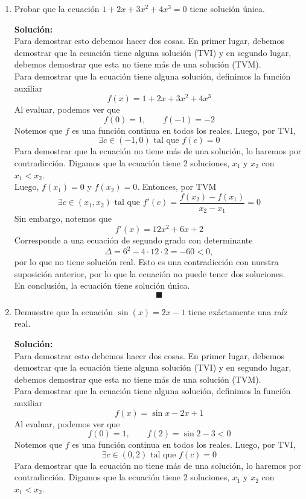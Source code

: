 \documentclass[12pt]{article}
\newenvironment{solucion}
{\begin{mdframed}[backgroundcolor=black!10]
		{\bf Solución:}\\
	}
	{
	\end{mdframed}
}
\newenvironment{preguntas}
{\begin{enumerate}\itemsep12pt
	}
	{
	\end{enumerate}
}
\newcommand{\ra}{\rightarrow}
\begin{document}
\begin{preguntas}
\begin{solucion}
Para $k\in (-\infty, -2) \cup (2, \infty)$, habrán dos puntos críticos en 
$$x = k + \sqrt[]{k^2-4} \qquad y \qquad x = k - \sqrt[]{k^2-4}$$
Notemos además que para $x < k \ra f''(x) < 0$ y para $x > k \ra f''(x) > 0$, por lo que el punto crítico $x = k + \sqrt[]{k^2-4} > k$ corresponderá a un mínimo y $x = k - \sqrt[]{k^2-4} < k$ corresponderá a un máximo.
\end{solucion}
\item Probar que la ecuación $1+2x+3x^2+4x^3=0$ tiene solución única.
\begin{solucion}
Para demostrar esto debemos hacer dos cosas. En primer lugar, debemos demostrar que la ecuación tiene alguna solución (TVI) y en segundo lugar, debemos demostrar que esta no tiene más de una solución (TVM).\\

Para demostrar que la ecuación tiene alguna solución, definimos la función auxiliar
$$f(x) = 1+2x+3x^2+4x^3$$
Al evaluar, podemos ver que
$$f(0) = 1, \qquad f(-1) = -2$$
Notemos que $f$ es una función continua en todos los reales. Luego, por TVI, 
$$\exists c \in (-1,0) \text{ tal que } f(c) = 0$$
Para demostrar que la ecuación no tiene más de una solución, lo haremos por contradicción. Digamos que la ecuación tiene 2 soluciones, $x_1$ y $x_2$ con $x_1 < x_2$.\\

Luego, $f(x_1) = 0$ y $f(x_2) = 0$. Entonces, por TVM
$$\exists c \in (x_1, x_2) \text{ tal que } f'(c) = \dfrac{f(x_2) - f(x_1)}{x_2-x_1} = 0$$
Sin embargo, notemos que
$$f'(x) = 12x^2 + 6x + 2$$
Corresponde a una ecuación de segundo grado con determinante 
$$\Delta = 6^2-4\cdot 12 \cdot 2 = -60 < 0,$$
por lo que no tiene solución real. Esto es una contradicción con nuestra suposición anterior, por lo que la ecuación no puede tener dos soluciones.\\

En conclusión, la ecuación tiene solución única. 
$$\blacksquare$$
\end{solucion}
\item Demuestre que la ecuación $\sin (x) = 2x-1$ tiene exáctamente una raíz real.
\begin{solucion}
Para demostrar esto debemos hacer dos cosas. En primer lugar, debemos demostrar que la ecuación tiene alguna solución (TVI) y en segundo lugar, debemos demostrar que esta no tiene más de una solución (TVM).\\

Para demostrar que la ecuación tiene alguna solución, definimos la función auxiliar
$$f(x) = \sin x - 2x + 1$$
Al evaluar, podemos ver que
$$f(0) = 1, \qquad f(2) = \sin 2 - 3 < 0$$
Notemos que $f$ es una función continua en todos los reales. Luego, por TVI, 
$$\exists c \in (0,2) \text{ tal que } f(c) = 0$$
Para demostrar que la ecuación no tiene más de una solución, lo haremos por contradicción. Digamos que la ecuación tiene 2 soluciones, $x_1$ y $x_2$ con $x_1 < x_2$.\\


\end{solucion}
\end{preguntas}
\end{document}
